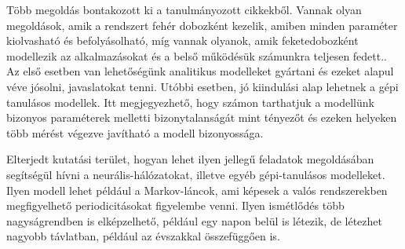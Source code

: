Több megoldás bontakozott ki a tanulmányozott cikkekből. Vannak olyan megoldások, amik a rendszert fehér dobozként kezelik, amiben minden paraméter kiolvasható és befolyásolható, míg vannak olyanok, amik feketedobozként modellezik az alkalmazásokat és a belső működésük számunkra teljesen fedett.\citep{TowardsAnAdaptive}. Az első esetben van lehetőségünk analitikus modelleket gyártani és ezeket alapul véve jósolni, javaslatokat tenni. Utóbbi esetben, jó kiindulási alap lehetnek a gépi tanulásos modellek. Itt megjegyezhető, hogy számon tarthatjuk a modellünk bizonyos paraméterek melletti bizonytalanságát mint tényezőt és ezeken helyeken több mérést végezve javítható a modell bizonyossága\citep{TowardsAnAdaptive}.

Elterjedt kutatási terület, hogyan lehet ilyen jellegű feladatok megoldásában segítségül hívni a neurális-hálózatokat, illetve egyéb gépi-tanulásos modelleket. Ilyen modell lehet például a Markov-láncok, ami képesek a valós rendszerekben megfigyelhető periodicitásokat figyelembe venni\citep{CloudScale}. Ilyen ismétlődés több nagyságrendben is elképzelhető, például egy napon belül is létezik, de létezhet nagyobb távlatban, például az évszakkal összefüggően is\citep{PredictingUsageAndProactiveScaling}.




